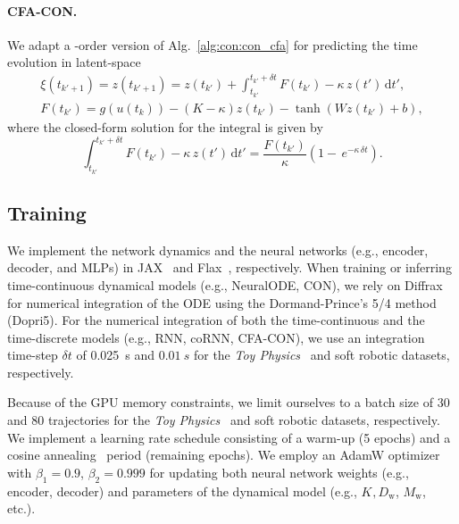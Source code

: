 \paragraph{CFA-CON.}
We adapt a -order version of Alg.~\ref{alg:con:con_cfa} for predicting the time evolution in latent-space
\begin{equation}
\begin{split}
    \xi(t_{k'+1}) = z(t_{k'+1}) = z(t_{k'}) + \int_{t_{k'}}^{t_{k'} + \delta t} F(t_{k'}) - \kappa \, z(t')  \, \mathrm{d}t',\\
    F(t_{k'}) = g(u(t_{k})) - (K - \kappa) z(t_{k'}) - \tanh(W z(t_{k'}) + b),
\end{split}
\end{equation}
where the closed-form solution for the integral is given by
\begin{equation}
    \int_{t_{k'}}^{t_{k'} + \delta t} F(t_{k'}) - \kappa \, z(t')  \, \mathrm{d}t' = \frac{F(t_{k'})}{\kappa} \left ( 1 - \, e^{- \kappa \, \delta t} \right ).
\end{equation}

\subsection{Training}
We implement the network dynamics and the neural networks (e.g., encoder, decoder, and \glspl{MLP}) in JAX~\cite{jax2018github} and Flax~\cite{flax2020github}, respectively. When training or inferring time-continuous dynamical models (e.g., NeuralODE, CON), we rely on Diffrax~\cite{kidger2021neural} for numerical integration of the \gls{ODE} using the Dormand-Prince's 5/4 method~\cite{dormand1980family} (Dopri5). For the numerical integration of both the time-continuous and the time-discrete models (e.g., RNN, \gls{coRNN}, \gls{CFA-CON}), we use an integration time-step $\delta t$ of \SI{0.025}{s} and $\SI{0.01}{s}$ for the \emph{Toy Physics}~\cite{botev2021priors} and soft robotic datasets, respectively.

Because of the GPU memory constraints, we limit ourselves to a batch size of $30$ and $80$ trajectories for the \emph{Toy Physics}~\cite{botev2021priors} and soft robotic datasets, respectively.
We implement a learning rate schedule consisting of a warm-up (5 epochs) and a cosine annealing~\cite{loshchilov2016sgdr} period (remaining epochs). 
We employ an AdamW optimizer~\cite{kingma2014adam, loshchilov2018decoupled} with $\beta_1 = 0.9$, $\beta_2 = 0.999$ for updating both neural network weights (e.g., encoder, decoder) and parameters of the dynamical model (e.g., $K_\mathrm{}, D_\mathrm{w}$, $M_\mathrm{w}$, etc.).

